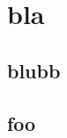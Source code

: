 \documentclass[12pt, twoside]{book}
\begin{document}
    \frontmatter

    \pagestyle{plain}
    
    
    
    \dominitoc
    \tableofcontents

    \mainmatter

    \chapter{bla}
    \minitoc
    \section{blubb}
    
    \section{foo}

    \printglossary[type=\acronymtype]
    \printglossary
    \printindex
\end{document}

